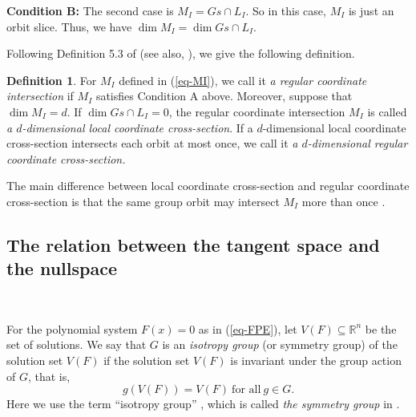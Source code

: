 \documentclass[reqno]{amsart}
\theoremstyle{definition}
\newtheorem{definition}[theorem]{Definition}
\numberwithin{equation}{section}
\theoremstyle{remark}
\begin{document}
\textbf{Condition B:} The second case is $M_I=Gs\cap L_I$. So in this case, $M_I$ is just an orbit slice. Thus, we have $\dim M_I=\dim Gs\cap L_I$.

Following Definition 5.3 of \cite{olver12mf} (see also, \cite[Sect. 8]{olver99c}), we give the following definition.
\begin{definition} %
For $M_I$ defined in (\ref{eq-MI}), we call it \emph{a regular coordinate intersection} if $M_I$ satisfies Condition A above.
Moreover, suppose that $\dim M_I=d$. If $\dim Gs\cap L_I=0$, the regular coordinate intersection $M_I$ is called  \emph{a $d$-dimensional local coordinate cross-section}. 
If a $d$-dimensional local coordinate cross-section intersects each orbit at most once, we call it \emph{a $d$-dimensional regular coordinate cross-section.}
\end{definition}

The main difference between local coordinate cross-section and regular coordinate cross-section is that the same group
orbit may intersect $M_I$ more than once \cite{olver95e,olver99c,olver12mf}.


\subsection{The relation between the tangent space and the nullspace}
\

For the polynomial system $F(x)=0$ as in (\ref{eq-FPE}), let $V(F)\subseteq \mathbb{R}^n$ be the set of solutions. 
We say that $G$ is an \emph{isotropy group} (or symmetry group) of the solution set $V(F)$ if the solution set $V(F)$ is invariant under the group action of $G$, that is,
$$g(V(F))=V(F)~\text{for~all}~g\in G.$$
Here we use the term ``isotropy group'' \cite{Bur15,deGr78-1}, which is called \emph{the symmetry group} in \cite{olver93li,olver95e,olver99c}.
\end{document}
